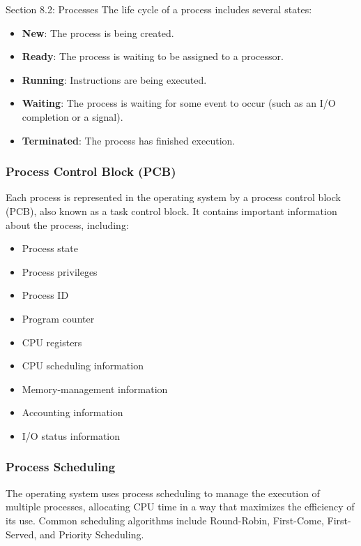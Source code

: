 \begin{notes}{Section 8.2: Processes}
    The life cycle of a process includes several states:
    \begin{itemize}
        \item \textbf{New}: The process is being created.
        \item \textbf{Ready}: The process is waiting to be assigned to a processor.
        \item \textbf{Running}: Instructions are being executed.
        \item \textbf{Waiting}: The process is waiting for some event to occur (such as an I/O completion or a signal).
        \item \textbf{Terminated}: The process has finished execution.
    \end{itemize}
    
    \subsubsection*{Process Control Block (PCB)}
    
    Each process is represented in the operating system by a process control block (PCB), also known as a task control block. It contains important information about the process, including:
    \begin{itemize}
        \item Process state
        \item Process privileges
        \item Process ID
        \item Program counter
        \item CPU registers
        \item CPU scheduling information
        \item Memory-management information
        \item Accounting information
        \item I/O status information
    \end{itemize}
    
    \subsubsection*{Process Scheduling}
    
    The operating system uses process scheduling to manage the execution of multiple processes, allocating CPU time in a way that maximizes the efficiency of its use. Common scheduling algorithms include 
    Round-Robin, First-Come, First-Served, and Priority Scheduling.
    

\end{notes}
